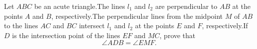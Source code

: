 Let $ABC$ be an acute triangle.The lines $l_1$ and $l_2$ are perpendicular to $AB$ at the points $A$ and $B$, respectively.The perpendicular lines from the midpoint $M$ of $AB$ to the lines $AC$ and $BC$ intersect $l_1$ and $l_2$ at the points $E$ and $F$, respectively.If $D$ is the intersection point of the lines $EF$ and $MC$, prove that \[\angle ADB = \angle EMF.\]